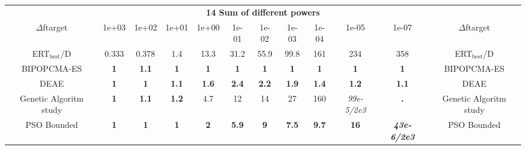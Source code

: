 \begin{tabular}{cccccccccccc}
 & \multicolumn{10}{c}{{\normalsize \textbf{14 Sum of different powers}}}\\
$\Delta$ftarget& 1e+03& 1e+02& 1e+01& 1e+00& 1e-01& 1e-02& 1e-03& 1e-04& 1e-05& 1e-07 & $\Delta$ftarget \\
ERT$_{\textrm{best}}$/D& 0.333& 0.378& 1.4& 13.3& 31.2& 55.9& 99.8& 161& 234& 358 & ERT$_{\textrm{best}}$/D \\
\hline
BIPOPCMA-ES & \textbf{1} & \textbf{1.1} & \textbf{1} & \textbf{1} & \textbf{1} & \textbf{1} & \textbf{1} & \textbf{1} & \textbf{1} & \textbf{1} & BIPOPCMA-ES \cite{add_an_entry_for_BIPOPCMA-ES_in_bbob.bib}\\
DEAE & \textbf{1} & \textbf{1} & \textbf{1.1} & \textbf{1.6} & \textbf{2.4} & \textbf{2.2} & \textbf{1.9} & \textbf{1.4} & \textbf{1.2} & \textbf{1.1} & DEAE \cite{add_an_entry_for_DEAE_in_bbob.bib}\\
Genetic Algoritm study & \textbf{1} & \textbf{1.1} & \textbf{1.2} & 4.7 & 12 & 14 & 27 & 160 & \textit{99e-5}\textit{/2e3} & \textbf{.} & Genetic Algoritm study \cite{add_an_entry_for_Genetic Algoritm study_in_bbob.bib}\\
PSO Bounded & \textbf{1} & \textbf{1} & \textbf{1} & \textbf{2} & \textbf{5.9} & \textbf{9} & \textbf{7.5} & \textbf{9.7} & \textbf{16} & \textbf{\textit{43e-6}\textit{/2e3}} & PSO Bounded \cite{add_an_entry_for_PSO Bounded_in_bbob.bib}
\end{tabular}
